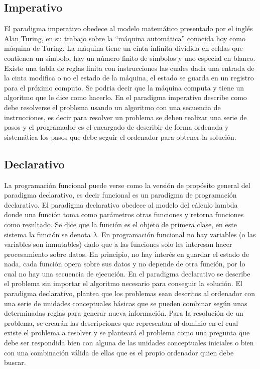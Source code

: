 \subsection{Imperativo}

El paradigma imperativo obedece al modelo matemático presentado por el inglés Alan Turing, en su trabajo sobre la “máquina automática” conocida hoy como máquina de Turing.
La máquina tiene un cinta infinita dividida en celdas que contienen un símbolo, hay un número finito de símbolos y uno especial en blanco. Existe una tabla de reglas finita con instrucciones las cuales dada una entrada de la cinta modifica o no el estado de la máquina, el estado se guarda en un registro para el próximo computo.
Se podria decir que la máquina computa y tiene un algoritmo que le dice como hacerlo.
En el paradigma imperativo describe como debe resolverse el problema usando un algoritmo con una secuencia de instrucciones, es decir para resolver un problema se deben realizar una serie de pasos y el programador es el encargado de describir de forma ordenada y sistemática los pasos que debe seguir el ordenador para obtener la solución.

\subsection{Declarativo}

La programación funcional puede verse como la versión de propósito general del paradigma declarativo, es decir funcional es un paradigma de programación declarativo.
El paradigma declarativo obedece al modelo del cálculo lambda donde una función toma como parámetros otras funciones y retorna funciones como resultado. Se dice que la función es el objeto de primera clase, en este sistema la función se denota $\lambda$.
En programación funcional no hay variables (o las variables son inmutables) dado que a las funciones solo les interesan hacer procesamiento sobre datos. En principio, no hay interés en guardar el estado de nada, cada función opera sobre sus datos y no depende de otra función, por lo cual no hay una secuencia de ejecución.
En el paradigma declarativo se describe el problema sin importar el algoritmo necesario para conseguir la solución.
El paradigma declarativo, plantea que los problemas sean descritos al ordenador con una serie de unidades conceptuales básicas que se pueden combinar según unas determinadas
reglas para generar nueva información. Para la resolución de un problema, se crearán las
descripciones que representan al dominio en el cual existe el problema a resolver y se planteará el problema como una pregunta que debe ser respondida bien con alguna de las unidades conceptuales iniciales o bien con una combinación válida de ellas que es el propio ordenador quien debe buscar.

